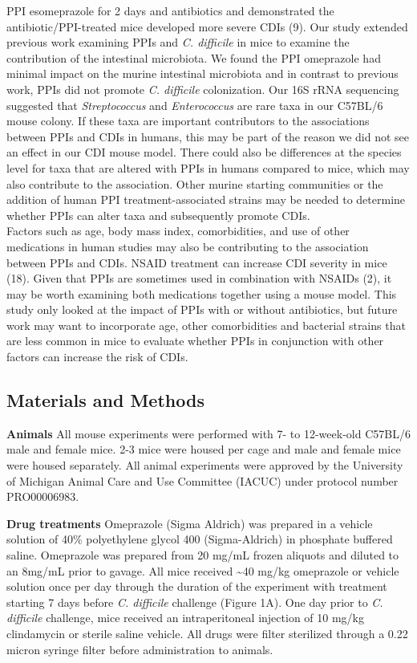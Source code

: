 \documentclass[11pt,]{article}
\begin{document}
PPI esomeprazole for 2 days and antibiotics and demonstrated the
antibiotic/PPI-treated mice developed more severe CDIs (9). Our study
extended previous work examining PPIs and \emph{C. difficile} in mice to
examine the contribution of the intestinal microbiota. We found the PPI
omeprazole had minimal impact on the murine intestinal microbiota and in
contrast to previous work, PPIs did not promote \emph{C. difficile}
colonization. Our 16S rRNA sequencing suggested that
\emph{Streptococcus} and \emph{Enterococcus} are rare taxa in our
C57BL/6 mouse colony. If these taxa are important contributors to the
associations between PPIs and CDIs in humans, this may be part of the
reason we did not see an effect in our CDI mouse model. There could also
be differences at the species level for taxa that are altered with PPIs
in humans compared to mice, which may also contribute to the
association. Other murine starting communities or the addition of human
PPI treatment-associated strains may be needed to determine whether PPIs
can alter taxa and subsequently promote CDIs.\\
Factors such as age, body mass index, comorbidities, and use of other
medications in human studies may also be contributing to the association
between PPIs and CDIs. NSAID treatment can increase CDI severity in mice
(18). Given that PPIs are sometimes used in combination with NSAIDs (2),
it may be worth examining both medications together using a mouse model.
This study only looked at the impact of PPIs with or without
antibiotics, but future work may want to incorporate age, other
comorbidities and bacterial strains that are less common in mice to
evaluate whether PPIs in conjunction with other factors can increase the
risk of CDIs.

\subsection{Materials and Methods}\label{materials-and-methods}

\textbf{Animals} All mouse experiments were performed with 7- to
12-week-old C57BL/6 male and female mice. 2-3 mice were housed per cage
and male and female mice were housed separately. All animal experiments
were approved by the University of Michigan Animal Care and Use
Committee (IACUC) under protocol number PRO00006983.

\textbf{Drug treatments} Omeprazole (Sigma Aldrich) was prepared in a
vehicle solution of 40\% polyethylene glycol 400 (Sigma-Aldrich) in
phosphate buffered saline. Omeprazole was prepared from 20 mg/mL frozen
aliquots and diluted to an 8mg/mL prior to gavage. All mice received
\textasciitilde{}40 mg/kg omeprazole or vehicle solution once per day
through the duration of the experiment with treatment starting 7 days
before \emph{C. difficile} challenge (Figure 1A). One day prior to
\emph{C. difficile} challenge, mice received an intraperitoneal
injection of 10 mg/kg clindamycin or sterile saline vehicle. All drugs
were filter sterilized through a 0.22 micron syringe filter before
administration to animals.
\end{document}
